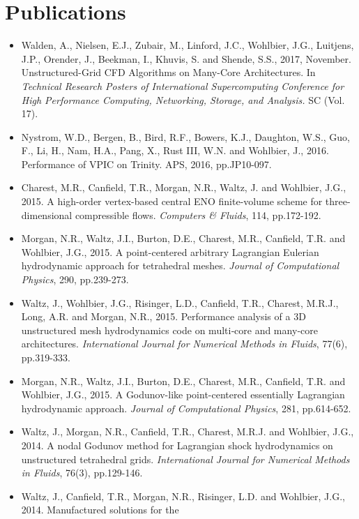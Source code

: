 \documentclass{muratcan_cv}
\begin{document}
\section{Publications}
\begin{itemize}

\item Walden, A., Nielsen, E.J., Zubair, M., Linford, J.C., Wohlbier,
  J.G., Luitjens, J.P., Orender, J., Beekman, I., Khuvis, S. and Shende,
  S.S., 2017, November. Unstructured-Grid CFD Algorithms on Many-Core
  Architectures. In {\it Technical Research Posters of International
  Supercomputing Conference for High Performance Computing, Networking,
  Storage, and Analysis.} SC (Vol. 17).
\item Nystrom, W.D., Bergen, B., Bird, R.F., Bowers, K.J., Daughton,
  W.S., Guo, F., Li, H., Nam, H.A., Pang, X., Rust III, W.N. and
  Wohlbier, J., 2016. Performance of VPIC on Trinity. APS, 2016,
  pp.JP10-097.
\item Charest, M.R., Canfield, T.R., Morgan, N.R., Waltz, J. and
  Wohlbier, J.G., 2015. A high-order vertex-based central ENO
  finite-volume scheme for three-dimensional compressible
  flows. {\it Computers \& Fluids}, 114, pp.172-192.
\item Morgan, N.R., Waltz, J.I., Burton, D.E., Charest, M.R.,
  Canfield, T.R. and Wohlbier, J.G., 2015. A point-centered arbitrary
  Lagrangian Eulerian hydrodynamic approach for tetrahedral
  meshes. {\it Journal of Computational Physics}, 290, pp.239-273.
\item Waltz, J., Wohlbier, J.G., Risinger, L.D., Canfield, T.R.,
  Charest, M.R.J., Long, A.R. and Morgan, N.R., 2015. Performance
  analysis of a 3D unstructured mesh hydrodynamics code on multi‐core
  and many‐core architectures. {\it International Journal for Numerical
  Methods in Fluids}, 77(6), pp.319-333.
\item Morgan, N.R., Waltz, J.I., Burton, D.E., Charest, M.R.,
  Canfield, T.R. and Wohlbier, J.G., 2015. A Godunov-like
  point-centered essentially Lagrangian hydrodynamic approach. {\it Journal
  of Computational Physics}, 281, pp.614-652.
\item Waltz, J., Morgan, N.R., Canfield, T.R., Charest, M.R.J. and
  Wohlbier, J.G., 2014. A nodal Godunov method for Lagrangian shock
  hydrodynamics on unstructured tetrahedral grids. {\it International
  Journal for Numerical Methods in Fluids}, 76(3), pp.129-146.
\item Waltz, J., Canfield, T.R., Morgan, N.R., Risinger, L.D. and
  Wohlbier, J.G., 2014. Manufactured solutions for the

\end{itemize}
\end{document}
